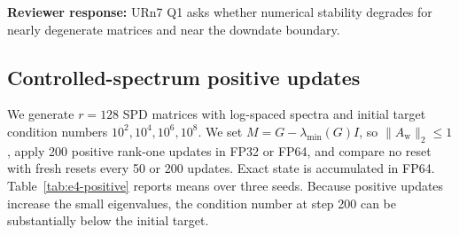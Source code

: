 \documentclass[11pt]{article}
\newcommand{\Aw}{A_{\mathrm w}}
\newcommand{\reviewer}[1]{\textbf{Reviewer response:} #1}
\begin{document}
\reviewer{URn7 Q1 asks whether numerical stability degrades for nearly
degenerate matrices and near the downdate boundary.}

\subsection{Controlled-spectrum positive updates}

We generate \(r=128\) SPD matrices with log-spaced spectra and initial target
condition numbers \(10^2,10^4,10^6,10^8\).  We set
\(M=G-\lambda_{\min}(G)I\), so \(\|\Aw\|_2\le1\), apply 200 positive rank-one
updates in FP32 or FP64, and compare no reset with fresh resets every 50 or
200 updates.  Exact state is accumulated in FP64.  Table~\ref{tab:e4-positive}
reports means over three seeds.  Because positive updates increase the small
eigenvalues, the condition number at step 200 can be substantially below the
initial target.
\end{document}
